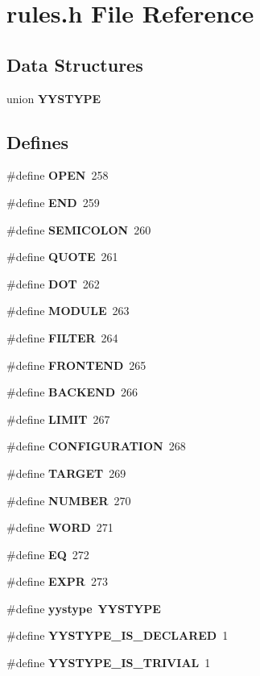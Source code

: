 \section{rules.h File Reference}
\label{rules_8h}
\subsection*{Data Structures}
\begin{CompactItemize}
\item 
union {\bf YYSTYPE}
\end{CompactItemize}
\subsection*{Defines}
\begin{CompactItemize}
\item 
\#define {\bf OPEN}~258
\item 
\#define {\bf END}~259
\item 
\#define {\bf SEMICOLON}~260
\item 
\#define {\bf QUOTE}~261
\item 
\#define {\bf DOT}~262
\item 
\#define {\bf MODULE}~263
\item 
\#define {\bf FILTER}~264
\item 
\#define {\bf FRONTEND}~265
\item 
\#define {\bf BACKEND}~266
\item 
\#define {\bf LIMIT}~267
\item 
\#define {\bf CONFIGURATION}~268
\item 
\#define {\bf TARGET}~269
\item 
\#define {\bf NUMBER}~270
\item 
\#define {\bf WORD}~271
\item 
\#define {\bf EQ}~272
\item 
\#define {\bf EXPR}~273
\item 
\#define {\bf yystype}~{\bf YYSTYPE}
\item 
\#define {\bf YYSTYPE\_\-IS\_\-DECLARED}~1
\item 
\#define {\bf YYSTYPE\_\-IS\_\-TRIVIAL}~1
\end{CompactItemize}
